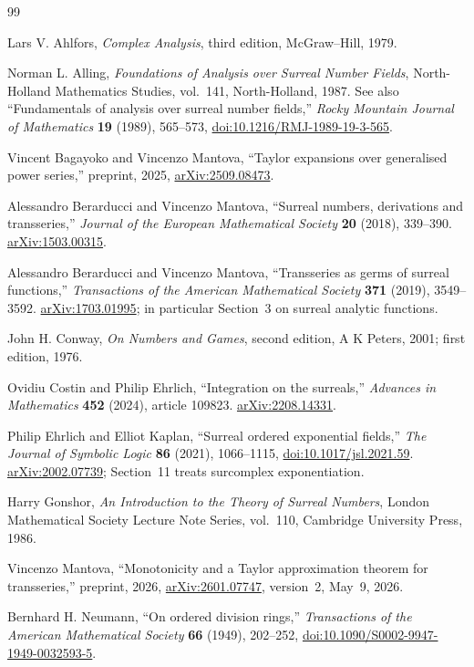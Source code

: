 \documentclass[11pt,letterpaper]{article}
\numberwithin{equation}{section}
\theoremstyle{definition}
\theoremstyle{remark}
\begin{document}
\begin{thebibliography}{99}

Lars V. Ahlfors,
\emph{Complex Analysis}, third edition,
McGraw--Hill, 1979.

Norman L. Alling,
\emph{Foundations of Analysis over Surreal Number Fields},
North-Holland Mathematics Studies, vol.~141,
North-Holland, 1987.
See also ``Fundamentals of analysis over surreal number fields,''
\emph{Rocky Mountain Journal of Mathematics} \textbf{19} (1989), 565--573,
\href{https://doi.org/10.1216/RMJ-1989-19-3-565}{doi:10.1216/RMJ-1989-19-3-565}.

Vincent Bagayoko and Vincenzo Mantova,
``Taylor expansions over generalised power series,''
preprint, 2025,
\href{https://arxiv.org/abs/2509.08473}{arXiv:2509.08473}.

Alessandro Berarducci and Vincenzo Mantova,
``Surreal numbers, derivations and transseries,''
\emph{Journal of the European Mathematical Society}
\textbf{20} (2018), 339--390.
\href{https://arxiv.org/abs/1503.00315}{arXiv:1503.00315}.

Alessandro Berarducci and Vincenzo Mantova,
``Transseries as germs of surreal functions,''
\emph{Transactions of the American Mathematical Society}
\textbf{371} (2019), 3549--3592.
\href{https://arxiv.org/abs/1703.01995}{arXiv:1703.01995};
in particular Section~3 on surreal analytic functions.

John H. Conway,
\emph{On Numbers and Games}, second edition,
A K Peters, 2001; first edition, 1976.

Ovidiu Costin and Philip Ehrlich,
``Integration on the surreals,''
\emph{Advances in Mathematics} \textbf{452} (2024), article 109823.
\href{https://arxiv.org/abs/2208.14331}{arXiv:2208.14331}.

Philip Ehrlich and Elliot Kaplan,
``Surreal ordered exponential fields,''
\emph{The Journal of Symbolic Logic} \textbf{86} (2021), 1066--1115,
\href{https://doi.org/10.1017/jsl.2021.59}{doi:10.1017/jsl.2021.59}.
\href{https://arxiv.org/abs/2002.07739}{arXiv:2002.07739};
Section~11 treats surcomplex exponentiation.

Harry Gonshor,
\emph{An Introduction to the Theory of Surreal Numbers},
London Mathematical Society Lecture Note Series, vol.~110,
Cambridge University Press, 1986.

Vincenzo Mantova,
``Monotonicity and a Taylor approximation theorem for transseries,''
preprint, 2026,
\href{https://arxiv.org/abs/2601.07747}{arXiv:2601.07747},
version~2, May~9, 2026.

Bernhard H. Neumann,
``On ordered division rings,''
\emph{Transactions of the American Mathematical Society}
\textbf{66} (1949), 202--252,
\href{https://doi.org/10.1090/S0002-9947-1949-0032593-5}
{doi:10.1090/S0002-9947-1949-0032593-5}.

\end{thebibliography}
\end{document}
